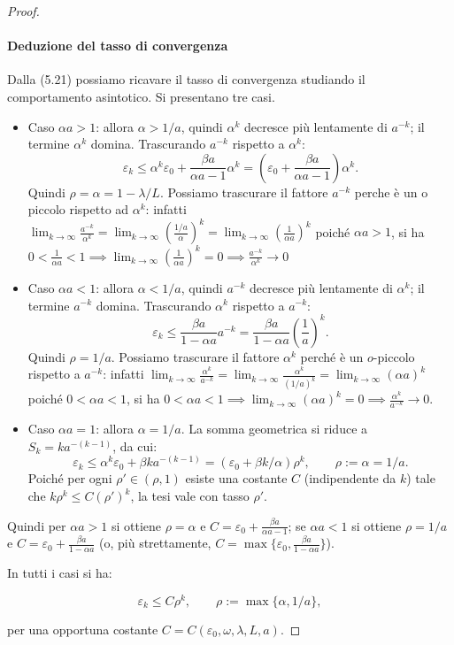 \documentclass[italian, a4paper, twoside, binding=6mm]{sapthesis}
\begin{document}
\begin{proof}
\paragraph{Deduzione del tasso di convergenza}

Dalla (5.21) possiamo ricavare il tasso di convergenza studiando il comportamento asintotico. Si presentano tre casi.

\begin{itemize}

\item Caso $\alpha a > 1$: allora $\alpha > 1/a$, quindi $\alpha^k$ decresce più lentamente di $a^{-k}$; il termine $\alpha^k$ domina. Trascurando $a^{-k}$ rispetto a $\alpha^k$:
\[
\varepsilon_k \le \alpha^k \varepsilon_0 + \frac{\beta a}{\alpha a - 1} \alpha^k
= \left(\varepsilon_0 + \frac{\beta a}{\alpha a - 1}\right) \alpha^k.
\]
Quindi $\rho = \alpha = 1 - \lambda/L$.
Possiamo trascurare il fattore $a^{-k}$ perche è un o piccolo rispetto ad $\alpha^k$: infatti $\lim_{k \to \infty} \frac{a^{-k}}{\alpha^k} = \lim_{k \to \infty} \left(\frac{1/a}{\alpha}\right)^k = \lim_{k \to \infty} \left(\frac{1}{\alpha a}\right)^k$ poiché $\alpha a > 1$, si ha $0 < \frac{1}{\alpha a} < 1 \implies \lim_{k \to \infty} \left(\frac{1}{\alpha a}\right)^k = 0 \implies \frac{a^{-k}}{\alpha^k} \to 0$

\item Caso $\alpha a < 1$: allora $\alpha < 1/a$, quindi $a^{-k}$ decresce più lentamente di $\alpha^k$; il termine $a^{-k}$ domina. Trascurando $\alpha^k$ rispetto a $a^{-k}$:
\[
\varepsilon_k \le \frac{\beta a}{1 - \alpha a} a^{-k}
= \frac{\beta a}{1 - \alpha a} \left(\frac{1}{a}\right)^k.
\]
Quindi $\rho = 1/a$.
Possiamo trascurare il fattore $\alpha^k$ perché è un $o$-piccolo rispetto a $a^{-k}$: infatti $\lim_{k \to \infty} \frac{\alpha^k}{a^{-k}}
= \lim_{k \to \infty} \frac{\alpha^k}{(1/a)^k}
= \lim_{k \to \infty} (\alpha a)^k$
poiché $0<\alpha a < 1$, si ha $0 < \alpha a < 1 \implies \lim_{k \to \infty} (\alpha a)^k = 0 \implies \frac{\alpha^k}{a^{-k}} \to 0$.
\item Caso $\alpha a = 1$: allora $\alpha = 1/a$. La somma geometrica si riduce a $S_k = k a^{-(k-1)}$, da cui:
\[
\varepsilon_k \le \alpha^k \varepsilon_0 + \beta k a^{-(k-1)} = (\varepsilon_0 + \beta k/\alpha)\rho^k,
\qquad\rho:=\alpha=1/a.
\]
Poich\'e per ogni $\rho' \in (\rho,1)$ esiste una costante $C$ (indipendente da $k$) tale che $k\rho^k \le C(\rho')^k$, la tesi vale con tasso $\rho'$.
\end{itemize}
 Quindi per $\alpha a>1$ si ottiene $\rho=\alpha$ e $C=\varepsilon_0+\frac{\beta a}{\alpha a-1}$; se $\alpha a<1$ si ottiene $\rho=1/a$ e $C=\varepsilon_0+\frac{\beta a}{1-\alpha a}$ (o, più strettamente, $C=\max\{\varepsilon_0,\frac{\beta a}{1-\alpha a}\}$).

In tutti i casi si ha:

\begin{equation}
\varepsilon_k \le C \rho^k, \qquad \rho := \max\{\alpha, 1/a\}, \tag{5.25}
\end{equation}

per una opportuna costante $C = C(\varepsilon_0, \omega, \lambda, L, a)$.


\end{proof}
\end{document}
